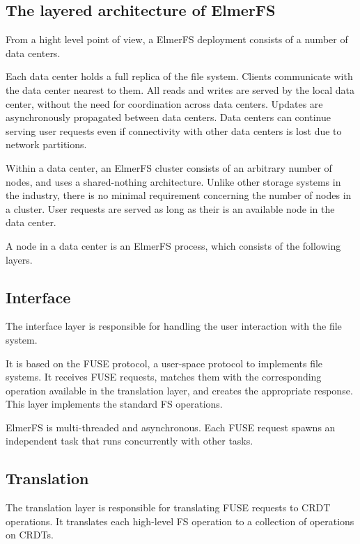 \documentclass[sigconf,anonymous,10pt]{acmart}
\begin{document}
\subsection{The layered architecture of ElmerFS}

From a hight level point of view, a ElmerFS deployment consists of a number
of data centers.

Each data center holds a full replica of the file system.
Clients communicate with the data center nearest to them.
All reads and writes are served by the local data center, without the need
for coordination across data centers.
Updates are asynchronously propagated between data centers.
Data centers can continue serving user requests even if connectivity
with other data centers is lost due to network partitions.

Within a data center, an ElmerFS cluster consists of an arbitrary number
of nodes, and uses a shared-nothing architecture.
Unlike other storage systems in the industry, there is no minimal
requirement concerning the number of nodes in a cluster. User requests are
served as long as their is an available node in the data center.

A node in a data center is an ElmerFS process, which consists of the following
layers.

\subsection{Interface}

The interface layer is responsible for handling the user interaction
with the file system.

It is based on the FUSE protocol, a user-space protocol to implements
file systems. It receives FUSE requests,
matches them with the corresponding operation available in
the translation layer, and creates the appropriate response.
This layer implements the standard FS operations.

ElmerFS is multi-threaded and asynchronous. Each FUSE request spawns an
independent task that runs concurrently with other tasks.

\subsection{Translation}

The translation layer is responsible for translating FUSE requests
to CRDT operations. It translates each high-level FS operation
to a collection of operations on CRDTs.
\end{document}
